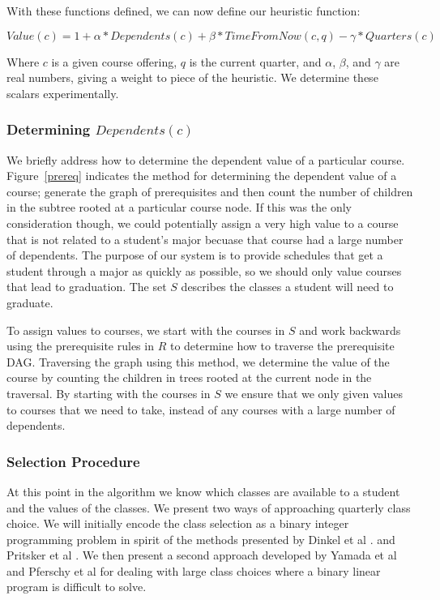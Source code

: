 \documentclass[11pt]{article} %
\begin{document}
With these functions defined, we can now define our heuristic function:

\begin{equation} 
    Value(c) = 1 + \alpha * Dependents(c) + \beta * TimeFromNow(c,q) 
    - \gamma * Quarters(c)
    \label{value_func}
\end{equation} 

Where $c$ is a given course offering, $q$ is the current quarter, and $\alpha$,
$\beta$, and $\gamma$ are real numbers, giving a weight to piece of the
heuristic.  We determine these scalars experimentally.

\subsubsection{Determining $Dependents(c)$} We briefly address how to determine
the dependent value of a particular course. Figure~\ref{prereq} indicates the
method for determining the dependent value of a course; generate the graph of
prerequisites and then count the number of children in the subtree rooted at
a particular course node. If this was the only consideration though, we could
potentially assign a very high value to a course that is not related to
a student's major becuase that course had a large number of dependents. The
purpose of our system is to provide schedules that get a student through a major
as quickly as possible, so we should only value courses that lead to graduation.
The set $S$ describes the classes a student will need to graduate.

To assign values to courses, we start with the courses in $S$ and work backwards
using the prerequisite rules in $R$ to determine how to traverse the
prerequisite DAG. Traversing the graph using this method, we determine the value
of the course by counting the children in trees rooted at the current node in
the traversal. By starting with the courses in $S$ we ensure that we only given
values to courses that we need to take, instead of any courses with a large
number of dependents.

\subsubsection{Selection Procedure} At this point in the algorithm we know which
classes are available to a student and the values of the classes.  We present two
ways of approaching quarterly class choice.  We will initially encode the class
selection as a binary integer programming problem in spirit of the methods
presented by Dinkel et al \cite{dinkel:scheduling}. and Pritsker et al
\cite{prisker:informs}.  We then present a second approach developed by Yamada et al
\cite{yamada:heuristic} and Pferschy et al \cite{pferschy:kcg} for
dealing with large class choices where a binary linear program is difficult to solve.
\end{document}
